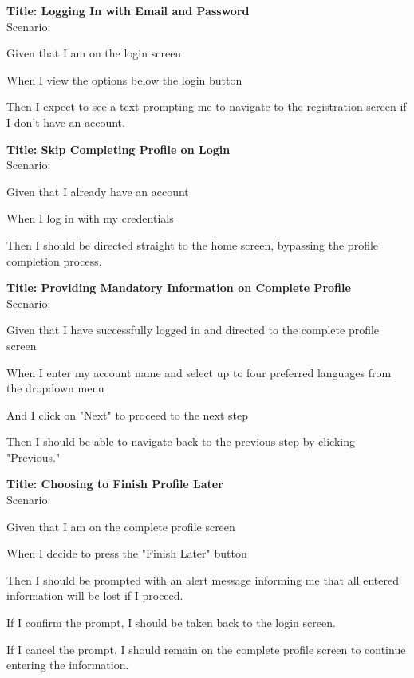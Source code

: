 \bigskip
\textbf{Title: Logging In with Email and Password} \\
Scenario:
\begin{compactitem}
    \item Given that I am on the login screen
    \item When I view the options below the login button
    \item Then I expect to see a text prompting me to navigate to the registration screen if I don't have an account.
\end{compactitem}

\bigskip
\textbf{Title: Skip Completing Profile on Login} \\
Scenario:
\begin{compactitem}
    \item Given that I already have an account
    \item When I log in with my credentials
    \item Then I should be directed straight to the home screen, bypassing the profile completion process.
\end{compactitem}

\bigskip
\textbf{Title: Providing Mandatory Information on Complete Profile} \\
Scenario:
\begin{compactitem}
    \item Given that I have successfully logged in and directed to the complete profile screen
    \item When I enter my account name and select up to four preferred languages from the dropdown menu
    \item And I click on "Next" to proceed to the next step
    \item Then I should be able to navigate back to the previous step by clicking "Previous."
\end{compactitem}

\bigskip
\textbf{Title: Choosing to Finish Profile Later} \\
Scenario:
\begin{compactitem}
    \item Given that I am on the complete profile screen
    \item When I decide to press the "Finish Later" button
    \item Then I should be prompted with an alert message informing me that all entered information will be lost if I proceed.
    \item If I confirm the prompt, I should be taken back to the login screen.
    \item If I cancel the prompt, I should remain on the complete profile screen to continue entering the information.
\end{compactitem}

